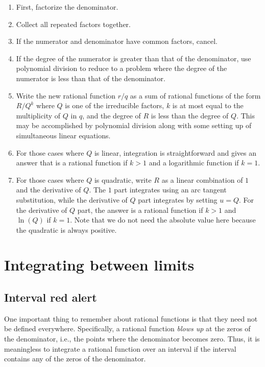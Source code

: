 \documentclass[10pt]{amsart}
\begin{document}
\begin{enumerate}
\item First, factorize the denominator.
\item Collect all repeated factors together.
\item If the numerator and denominator have common factors, cancel.
\item If the degree of the numerator is greater than that of the
  denominator, use polynomial division to reduce to a problem where the
  degree of the numerator is less than that of the denominator.
\item Write the new rational function $r/q$ as a sum of rational
  functions of the form $R/Q^k$ where $Q$ is one of the irreducible
  factors, $k$ is at most equal to the multiplicity of $Q$ in $q$, and
  the degree of $R$ is less than the degree of $Q$. This may be
  accomplished by polynomial division along with some setting up of
  simultaneous linear equations.
\item For those cases where $Q$ is linear, integration is
  straightforward and gives an answer that is a rational function if
  $k > 1$ and a logarithmic function if $k = 1$.
\item For those cases where $Q$ is quadratic, write $R$ as a linear
  combination of $1$ and the derivative of $Q$. The $1$ part
  integrates using an arc tangent substitution, while the derivative
  of $Q$ part integrates by setting $u = Q$. For the derivative of $Q$
  part, the answer is a rational function if $k > 1$ and $\ln(Q)$ if
  $k = 1$. Note that we do not need the absolute value here because
  the quadratic is always positive.
\end{enumerate}

\section{Integrating between limits}

\subsection{Interval red alert}

One important thing to remember about rational functions is that they
need not be defined everywhere. Specifically, a rational function {\em
blows up} at the zeros of the denominator, i.e., the points where the
denominator becomes zero. Thus, it is meaningless to integrate a
rational function over an interval if the interval contains any of the
zeros of the denominator.
\end{document}
